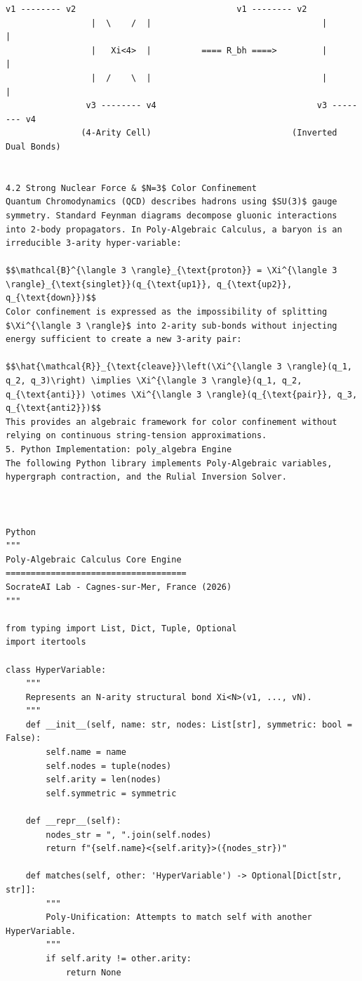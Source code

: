 \documentclass[11pt,a4paper]{article}
\begin{document}
\begin{lstlisting}[language={}, caption={}, basicstyle=\ttfamily\footnotesize, breaklines=true]
                v1 -------- v2                                v1 -------- v2
                 |  \    /  |                                  |          |
                 |   Xi<4>  |          ==== R_bh ====>         |          |
                 |  /    \  |                                  |          |
                v3 -------- v4                                v3 -------- v4
               (4-Arity Cell)                            (Inverted Dual Bonds)


4.2 Strong Nuclear Force & $N=3$ Color Confinement
Quantum Chromodynamics (QCD) describes hadrons using $SU(3)$ gauge symmetry. Standard Feynman diagrams decompose gluonic interactions into 2-body propagators. In Poly-Algebraic Calculus, a baryon is an irreducible 3-arity hyper-variable:

$$\mathcal{B}^{\langle 3 \rangle}_{\text{proton}} = \Xi^{\langle 3 \rangle}_{\text{singlet}}(q_{\text{up1}}, q_{\text{up2}}, q_{\text{down}})$$
Color confinement is expressed as the impossibility of splitting $\Xi^{\langle 3 \rangle}$ into 2-arity sub-bonds without injecting energy sufficient to create a new 3-arity pair:

$$\hat{\mathcal{R}}_{\text{cleave}}\left(\Xi^{\langle 3 \rangle}(q_1, q_2, q_3)\right) \implies \Xi^{\langle 3 \rangle}(q_1, q_2, q_{\text{anti}}) \otimes \Xi^{\langle 3 \rangle}(q_{\text{pair}}, q_3, q_{\text{anti2}})$$
This provides an algebraic framework for color confinement without relying on continuous string-tension approximations.
5. Python Implementation: poly_algebra Engine
The following Python library implements Poly-Algebraic variables, hypergraph contraction, and the Rulial Inversion Solver.



Python
"""
Poly-Algebraic Calculus Core Engine
====================================
SocrateAI Lab - Cagnes-sur-Mer, France (2026)
"""

from typing import List, Dict, Tuple, Optional
import itertools

class HyperVariable:
    """
    Represents an N-arity structural bond Xi<N>(v1, ..., vN).
    """
    def __init__(self, name: str, nodes: List[str], symmetric: bool = False):
        self.name = name
        self.nodes = tuple(nodes)
        self.arity = len(nodes)
        self.symmetric = symmetric

    def __repr__(self):
        nodes_str = ", ".join(self.nodes)
        return f"{self.name}<{self.arity}>({nodes_str})"

    def matches(self, other: 'HyperVariable') -> Optional[Dict[str, str]]:
        """
        Poly-Unification: Attempts to match self with another HyperVariable.
        """
        if self.arity != other.arity:
            return None
        

\end{lstlisting}
\end{document}
